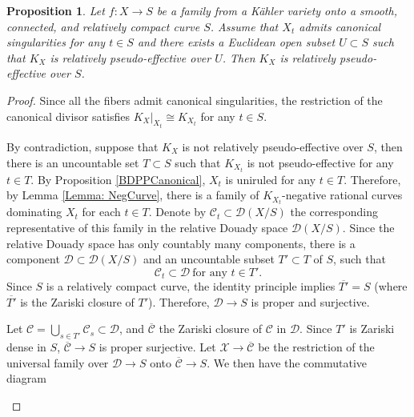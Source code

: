 \documentclass[12pt]{amsart}
\numberwithin{equation}{section}
\newtheorem{proposition}[theorem]{Proposition}
\theoremstyle{definition}
\theoremstyle{plain}
\newtheorem*{thm A*}{Theorem A}
\newtheorem*{thm B*}{Theorem B}
\newtheorem*{thm C*}{Theorem C}
\newtheorem*{thm D*}{Theorem D}
\theoremstyle{definition}
\renewcommand{\1}{\mathds{1}}
\renewcommand{\>}{\rightarrow}
\begin{document}
\begin{proposition}\label{pseflocalglobal}
Let $f:X\to S$ be a family from a K\"ahler variety onto a smooth, connected, and relatively compact curve $S$. Assume that $X_t$ admits canonical singularities for any $t\in S$ and there exists a Euclidean open subset $U\subset S $ such that $K_X$ is relatively pseudo-effective over $U$. Then $K_X$ is relatively pseudo-effective over $S$.
\end{proposition}

\begin{proof}
Since all the fibers admit canonical singularities, the restriction of the canonical divisor satisfies $K_X|_{X_{t}} \cong K_{X_{t}}$ for any $t\in S$. 

By contradiction, suppose that $K_X$ is not relatively pseudo-effective over $S$, then there is an uncountable set $T\subset  S$ such that $K_{X_t}$ is not pseudo-effective for any $t\in T$. By Proposition \ref{BDPPCanonical}, $X_t$ is uniruled for any $t\in T$. Therefore, by Lemma \ref{Lemma: NegCurve}, there is a family of $K_{X_t}$-negative rational curves dominating $X_t$ for each $t\in T$. Denote by $\mathcal{C}_t\subset \mathcal{D}(X/S)$ the corresponding representative of this family in the relative Douady space $\mathcal{D}(X/S)$. Since the relative Douady space has only countably many components, there is a component $\mathcal{D}\subset \mathcal{D}(X/S)$ and an uncountable subset $T' \subset T$ of $S$, such 
that $$\mathcal{C}_t\subset \mathcal{D}\ \text{for any } t\in T'.$$
Since $S$ is a relatively compact curve, the identity principle implies $\overline{T'} = S$ (where $\overline{T'}$ is the Zariski closure of $T'$). Therefore, $\mathcal{D} \to S$ is proper and surjective. 

Let $
\mathcal{C} = \bigcup_{s \in T'} \mathcal{C}_s \subset \mathcal{D}$, 
and $\overline{\mathcal{C}}$ the Zariski closure of $\mathcal{C}$ in $\mathcal{D}$. Since $T'$ is Zariski dense in $S$, $\overline{\mathcal{C}} \to S$ is proper surjective. Let $\mathcal{X}\to \overline{\mathcal{C}}$ be the restriction of the universal family over $\mathcal{D} \to S$ onto $\overline{\mathcal{C}}\to S$. We then have the commutative diagram
\begin{center}
\end{center}


\end{proof}
\end{document}
